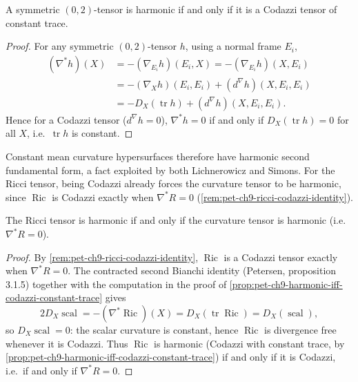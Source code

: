 \begin{proposition}[Proposition 9.4.4]
  \label{prop:pet-ch9-harmonic-iff-codazzi-constant-trace}
  A symmetric $(0,2)$-tensor is harmonic if and only if it is a Codazzi tensor
  of constant trace.
\end{proposition}
\begin{proof}
  For any symmetric $(0,2)$-tensor $h$, using a normal frame $E_i$,
  \begin{align*}
    (\nabla^*h)(X)&=-(\nabla_{E_i}h)(E_i,X)=-(\nabla_{E_i}h)(X,E_i)\\
    &=-(\nabla_Xh)(E_i,E_i)+(d^\nabla h)(X,E_i,E_i)\\
    &=-D_X(\operatorname{tr}h)+(d^\nabla h)(X,E_i,E_i).
  \end{align*}
  Hence for a Codazzi tensor ($d^\nabla h=0$), $\nabla^*h=0$ if and only if
  $D_X(\operatorname{tr}h)=0$ for all $X$, i.e.\ $\operatorname{tr}h$ is constant.
\end{proof}

Constant mean curvature hypersurfaces therefore have harmonic second
fundamental form, a fact exploited by both Lichnerowicz and Simons. For the
Ricci tensor, being Codazzi already forces the curvature tensor to be
harmonic, since $\operatorname{Ric}$ is Codazzi exactly when $\nabla^*R=0$
(\cref{rem:pet-ch9-ricci-codazzi-identity}).

\begin{corollary}[Corollary 9.4.5]
  \label{cor:pet-ch9-ricci-harmonic-iff-curvature-harmonic}
  The Ricci tensor is harmonic if and only if the curvature tensor is
  harmonic (i.e.\ $\nabla^*R=0$).
\end{corollary}
\begin{proof}
  By \cref{rem:pet-ch9-ricci-codazzi-identity}, $\operatorname{Ric}$ is a Codazzi tensor
  exactly when $\nabla^*R=0$. The contracted second Bianchi identity
  (Petersen, proposition 3.1.5) together with the computation in the proof of
  \cref{prop:pet-ch9-harmonic-iff-codazzi-constant-trace} gives
  \[
    2D_X\operatorname{scal}=-(\nabla^*\operatorname{Ric})(X)=D_X(\operatorname{tr}\operatorname{Ric})=D_X(\operatorname{scal}),
  \]
  so $D_X\operatorname{scal}=0$: the scalar curvature is constant, hence
  $\operatorname{Ric}$ is divergence free whenever it is Codazzi. Thus $\operatorname{Ric}$
  is harmonic (Codazzi with constant trace, by
  \cref{prop:pet-ch9-harmonic-iff-codazzi-constant-trace}) if and only if it is
  Codazzi, i.e.\ if and only if $\nabla^*R=0$.
\end{proof}

